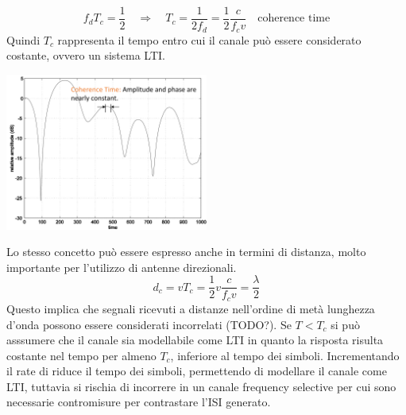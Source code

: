 \[
    f_d T_c = \frac{1}{2} \quad \Rightarrow \quad  T_c = \frac{1}{2 f_d} = \frac{1}{2} \frac{c}{f_c v} \quad \text{coherence time}
\]
Quindi $T_c$ rappresenta il tempo entro cui il canale può essere considerato costante, ovvero un sistema LTI.
\begin{center}
    \includegraphics[width=0.5\textwidth]{imgs/coherence_time.png}
\end{center}


Lo stesso concetto può essere espresso anche in termini di distanza, molto importante per l'utilizzo di antenne direzionali.
\[
    d_c = v T_c = \frac{1}{2} v \frac{c}{f_c v} = \frac{\lambda}{2}
\]
Questo implica che segnali ricevuti a distanze nell'ordine di metà lunghezza d'onda possono essere considerati incorrelati (TODO?).
Se $T < T_c$ si può asssumere che il canale sia modellabile come LTI in quanto la risposta risulta costante nel tempo per almeno $T_c$, inferiore al tempo dei simboli.
Incrementando il rate di riduce il tempo dei simboli, permettendo di modellare il canale come LTI, tuttavia si rischia di incorrere in un canale frequency selective per cui sono necessarie contromisure per contrastare l'ISI generato.




